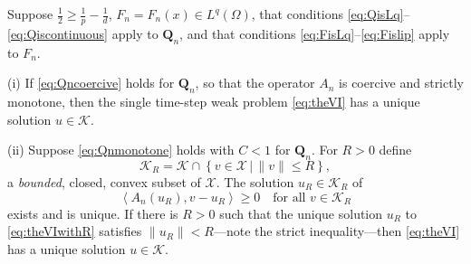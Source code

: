 \documentclass[final,leqno,onefignum,onetabnum]{siamltex1213bueler}
\newcommand\bQ{\mathbf{Q}}
\newcommand{\ip}[2]{\ensuremath{\left<#1,#2\right>}}
\begin{document}
\medskip
\begin{theorem}  \label{thm:monowellposed}  Suppose $\frac{1}{2} \ge \frac{1}{p} - \frac{1}{d}$, $F_n=F_n(x)\in L^q(\Omega)$, that conditions \eqref{eq:QisLq}--\eqref{eq:Qiscontinuous} apply to $\bQ_n$, and that conditions \eqref{eq:FisLq}--\eqref{eq:Fislip} apply to $F_n$.

(i)  If \eqref{eq:Qncoercive} holds for $\bQ_n$, so that the operator $A_n$ is coercive and strictly monotone, then the single time-step weak problem \eqref{eq:theVI} has a unique solution $u\in\mathcal{K}$.

(ii) Suppose \eqref{eq:Qnmonotone} holds with $C<1$ for $\bQ_n$.  For $R>0$ define
    $$\mathcal{K}_R = \mathcal{K} \cap \left\{v\in \mathcal{X} \,\Big|\, \|v\|\le R\right\},$$
a \emph{bounded}, closed, convex subset of $\mathcal{X}$.  The solution $u_R\in \mathcal{K}_R$ of
\begin{equation}
  \ip{A_n(u_R)}{v-u_R} \ge 0 \quad \text{for all $v \in \mathcal{K}_R$} \label{eq:theVIwithR}
\end{equation}
exists and is unique.  If there is $R>0$ such that the unique solution $u_R$ to \eqref{eq:theVIwithR} satisfies $\|u_R\| < R$---note the strict inequality---then \eqref{eq:theVI} has a unique solution $u\in\mathcal{K}$.
\end{theorem}
\end{document}
